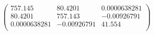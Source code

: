 \documentclass{article}
\begin{document}
\[\left(
\begin{array}{ccc}
 757.145 & 80.4201 & 0.0000638281 \\
 80.4201 & 757.143 & -0.00926791 \\
 0.0000638281 & -0.00926791 & 41.554 \\
\end{array}
\right)\]
\end{document}
